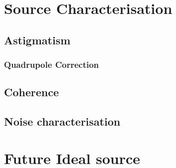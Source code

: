 \section{Source Characterisation}

\subsection{Astigmatism}

\subsubsection{Quadrupole Correction}\label{section:quadrupole}

\subsection{Coherence}

\subsection{Noise characterisation}

\section{Future Ideal source}